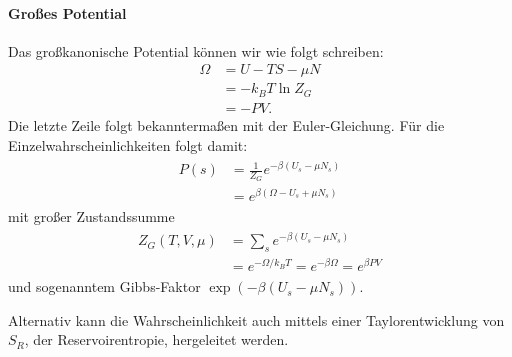 \paragraph*{Großes Potential} Das großkanonische Potential können wir wie folgt schreiben:
\begin{align*}
    \Omega&=U-TS-\mu N\\
    &=-k_B T\ln Z_G\\
    &=-PV.
\end{align*}
Die letzte Zeile folgt bekanntermaßen mit der Euler-Gleichung. 
Für die Einzelwahrscheinlichkeiten folgt damit:
\begin{align}
    \label{eq:Wahrscheinlichkeit}
    \boxed{
        \begin{aligned}
         P(s)&=\frac{1}{Z_G}e^{-\beta(U_s-\mu N_s)}\\
         &= e^{\beta(\Omega-U_s+\mu N_s)} 
        \end{aligned}    
    }
\end{align}
mit großer Zustandssumme 
\begin{align}
    \label{eq:grosse_Zustandssumme}
    \boxed{
        \begin{aligned}
            Z_G(T,V,\mu)&=\sum_s e^{-\beta(U_s-\mu N_s)}\\
            &=e^{-\Omega/k_B T} = e^{-\beta \Omega}=e^{\beta PV}
        \end{aligned}    
    }
\end{align}
und sogenanntem Gibbs-Faktor $\exp(-\beta(U_s-\mu N_s))$.

Alternativ kann die Wahrscheinlichkeit auch mittels einer Taylorentwicklung von $S_R$, der Reservoirentropie, hergeleitet werden.






